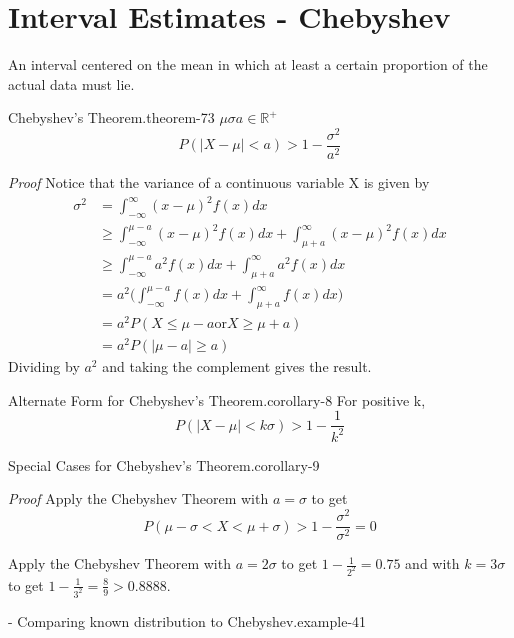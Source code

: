 \documentclass[10pt,]{book}
\makeatletter
\renewcommand*{\proofname}{Proof}
\renewenvironment{proof}[1][\proofname]{\par
  \pushQED{\qed}%
  \normalfont \topsep6\p@\@plus6\p@\relax
  \trivlist
  \item\relax
    {\itshape
    #1\@addpunct{.}}\hspace\labelsep\ignorespaces
}{%
  \popQED\endtrivlist\@endpefalse
}
\numberwithin{equation}{section}
\newcommand{\lt}{<}
\newcommand{\gt}{>}
\makeatother
\begin{document}
\section[{Interval Estimates - Chebyshev}]{Interval Estimates - Chebyshev}\label{section-66}
\hypertarget{p-1096}{}%
An interval centered on the mean in which at least a certain proportion of the actual data must lie.%
\begin{theorem}{Chebyshev's Theorem.}{}{theorem-73}%
\(\mu\)\(\sigma\)\(a \in \mathbb{R}^+\)%
\begin{equation*}
P( \big | X - \mu \big | \lt a ) \gt 1 - \frac{\sigma^2}{a^2}
\end{equation*}
\end{theorem}
\begin{proof}\hypertarget{proof-70}{}
\hypertarget{p-1097}{}%
Notice that the variance of a continuous variable X is given by%
\begin{align*}
\sigma^2 & = \int_{-\infty}^{\infty} (x - \mu)^2 f(x) dx\\
& \ge \int_{-\infty}^{\mu-a} (x - \mu)^2 f(x) dx + \int_{\mu + a}^{\infty} (x - \mu)^2 f(x) dx\\
& \ge \int_{-\infty}^{\mu-a} a^2 f(x) dx + \int_{\mu + a}^{\infty} a^2 f(x) dx\\
& = a^2 \big ( \int_{-\infty}^{\mu-a} f(x) dx + \int_{\mu + a}^{\infty} f(x) dx \big )\\
& = a^2 P( X \le \mu - a \text{or} X \ge \mu + a )\\
& = a^2 P( \big | \mu - a \big | \ge a)
\end{align*}
Dividing by \(a^2\) and taking the complement gives the result.%
\end{proof}
\begin{corollary}{Alternate Form for Chebyshev's Theorem.}{}{corollary-8}%
\hypertarget{p-1098}{}%
For positive k,%
\begin{equation*}
P( \big | X - \mu \big | \lt k \sigma ) \gt 1 - \frac{1}{k^2}
\end{equation*}
%
\end{corollary}
\begin{corollary}{Special Cases for Chebyshev's Theorem.}{}{corollary-9}%
\end{corollary}
\begin{proof}\hypertarget{proof-71}{}
\hypertarget{p-1099}{}%
Apply the Chebyshev Theorem with \(a = \sigma\) to get%
\begin{equation*}
P(\mu - \sigma \lt X \lt \mu + \sigma) \gt 1 - \frac{\sigma^2}{\sigma^2} = 0
\end{equation*}
%
\par
\hypertarget{p-1100}{}%
Apply the Chebyshev Theorem with \(a = 2 \sigma\) to get \(1 - \frac{1}{2^2} = 0.75\) and with \(k = 3 \sigma\) to get \(1 - \frac{1}{3^2} = \frac{8}{9} > 0.8888\).%
\end{proof}
\begin{example}{- Comparing known distribution to Chebyshev.}{example-41}%
\hypertarget{p-1101}{}%
%
\end{example}
%
%
\typeout{************************************************}
\typeout{************************************************}
%
\end{document}

